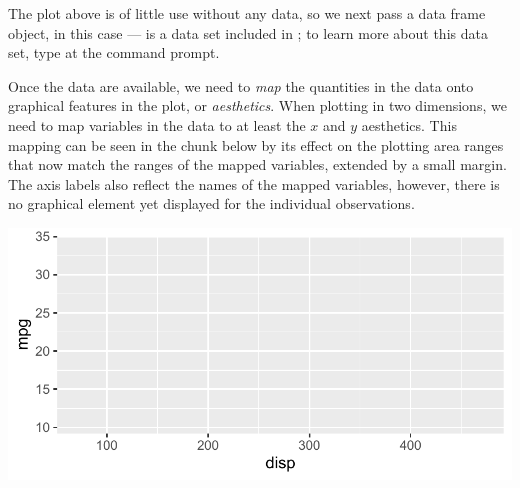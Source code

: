 \documentclass[krantz2]{krantz}\usepackage{knitr}
\begin{document}
The plot above is of little use without any data, so we next pass a data frame object, in this case --- is a data set included in \Rlang; to learn more about this data set, type  at the \Rlang command prompt.

\begin{knitrout}\footnotesize
{}\color{fgcolor}\begin{kframe}
\begin{alltt}
\hlstd{(} 
\end{alltt}
\end{kframe}
\end{knitrout}

Once the data are available, we need to \emph{map} the quantities in the data onto graphical features in the plot, or \emph{aesthetics}. When plotting in two dimensions, we need to map variables in the data to at least the $x$ and $y$ aesthetics. This mapping can be seen in the chunk below by its effect on the plotting area ranges that now match the ranges of the mapped variables, extended by a small margin. The axis labels also reflect the names of the mapped variables, however, there is no graphical element yet displayed for the individual observations.

\begin{knitrout}\footnotesize
{}\color{fgcolor}\begin{kframe}
\begin{alltt}
\hlstd{(} 
       \hlstd{(}   
\end{alltt}
\end{kframe}

{\centering \includegraphics[width=.7\textwidth]{figure/pos-ggplot-basics-03-1}

}



\end{knitrout}
\end{document}
